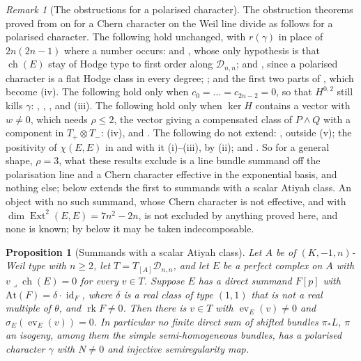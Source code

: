 \documentclass[11pt,reqno]{amsart}
\theoremstyle{plain}
\newtheorem{proposition}[theorem]{Proposition}
\theoremstyle{definition}
\theoremstyle{remark}
\newtheorem{remark}[theorem]{Remark}
\newcommand{\cD}{\mathcal{D}}
\DeclareMathOperator{\ch}{ch}
\DeclareMathOperator{\rk}{rk}
\DeclareMathOperator{\Ext}{Ext}
\DeclareMathOperator{\id}{id}
\begin{document}
\begin{remark}[The obstructions for a polarised character]
\label{rem:p2primesurvive}
The obstruction theorems proved from \cite[Section~9]{paperI} on for a Chern
character on the Weil line divide as follows for a polarised character. The
following hold unchanged, with
$r(\gamma)$ in place of $2n(2n-1)$ where a number occurs:
\cite[Theorem~9.20]{paperI} and , whose only hypothesis is that
$\ch(E)$ stay of Hodge type to first order along $\cD_{n,n}$;
 and , since a polarised character
is a flat Hodge class in every degree; ; and the
first two parts of , which become
(iv). The following hold only when
$c_{0}=\dots=c_{2n-2}=0$, so that $H^{0,2}$ still kills $\gamma$:
\cite[Theorem~9.7]{paperI}, \cite[Proposition~9.10]{paperI}, \cite[Corollary~9.18]{paperI},
\cite[Theorem~9.19]{paperI} and (iii). The following hold only
when $\ker H$ contains a vector with $w\ne0$, which needs $\rho\le2$, the
vector giving a compensated class of $P\wedge Q$ with a component in
$T_{+}\otimes T_{-}$: (iv),  and
. The following do not extend: ,
outside (v); the positivity of $\chi(E,E)$ in
\cite[Proposition~9.11]{paperI} and with it (i)--(iii), by
(ii); and \cite[Theorem~2.32]{paperIII}. So for a general shape,
$\rho=3$, what these results exclude is a line bundle summand off the
polarisation line and a Chern character effective in the exponential basis,
and nothing else;  below extends the first to
summands with a scalar Atiyah class. An object with no such summand, whose
Chern character is not effective, and with $\dim\Ext^{2}(E,E)=7n^{2}-2n$, is
not excluded by anything proved here, and none is known; by
 below it may be taken indecomposable.
\end{remark}

\begin{proposition}[Summands with a scalar Atiyah class]\label{prop:scalaratiyah}
Let $A$ be of $(K,-1,n)$-Weil type with $n\ge2$, let $T=T_{[A]}\cD_{n,n}$, and
let $E$ be a perfect complex on $A$ with $v\lrcorner\ch(E)=0$ for every
$v\in T$. Suppose $E$ has a direct summand $F[p]$ with
$\mathrm{At}(F)=\delta\cdot\id_{F}$, where $\delta$ is a real class of type
$(1,1)$ that is not a real multiple of $\theta$, and $\rk F\ne0$. Then there is
$v\in T$ with $\operatorname{ev}_{E}(v)\ne0$ and
$\sigma_{E}(\operatorname{ev}_{E}(v))=0$. In particular no finite direct sum
of shifted bundles $\pi_{*}L$, $\pi$ an isogeny, among them the simple
semi-homogeneous bundles, has a polarised character $\gamma$ with $N\ne0$ and
injective semiregularity map.
\end{proposition}
\end{document}
